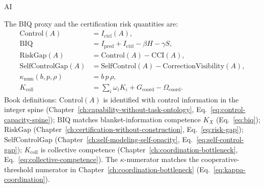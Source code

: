 \begin{authbar}{AI}
\begin{definition}
\label{appi:def:spine-capability-risk}
The BIQ proxy and the certification risk quantities are:
\begin{align}
\label{appi:eq:control}
\mathrm{Control}(A) &= I_{\mathrm{ctrl}}(A),\\
\label{appi:eq:biq}
\mathrm{BIQ} &= I_{\mathrm{pred}}+I_{\mathrm{ctrl}}-\beta H-\gamma S,\\
\label{appi:eq:risk-gap}
\mathrm{RiskGap}(A) &= \mathrm{Control}(A)-\mathrm{CCI}(A),\\
\label{appi:eq:self-control-gap}
\mathrm{SelfControlGap}(A) &= \mathrm{SelfControl}(A)-\mathrm{CorrectionVisibility}(A),\\
\label{appi:eq:kappa-numerator}
\kappa_{\mathrm{num}}(b,p,\rho) &= b\,p\,\rho,\\
\label{appi:eq:collective-competence}
K_{\mathrm{coll}} &= \sum_i \omega_i K_i + G_{\mathrm{coord}} - \Omega_{\mathrm{coord}} .
\end{align}
Book definitions: \(\mathrm{Control}(A)\) is identified with control information in the integer spine (Chapter~\ref{ch:capability-without-task-ontology}, Eq.~\eqref{eq:control-capacity-spine}); \(\mathrm{BIQ}\) matches blanket-information competence \(K_X\) (Eq.~\eqref{eq:biq}); \(\mathrm{RiskGap}\) (Chapter~\ref{ch:certification-without-construction}, Eq.~\eqref{eq:risk-gap}); \(\mathrm{SelfControlGap}\) (Chapter~\ref{ch:self-modeling-self-opacity}, Eq.~\eqref{eq:self-control-gap}); \(K_{\mathrm{coll}}\) is collective competence (Chapter~\ref{ch:coordination-bottleneck}, Eq.~\eqref{eq:collective-competence}).
The \(\kappa\)-numerator matches the cooperative-threshold numerator in Chapter~\ref{ch:coordination-bottleneck} (Eq.~\eqref{eq:kappa-coordination}).
\end{definition}


\end{authbar}
